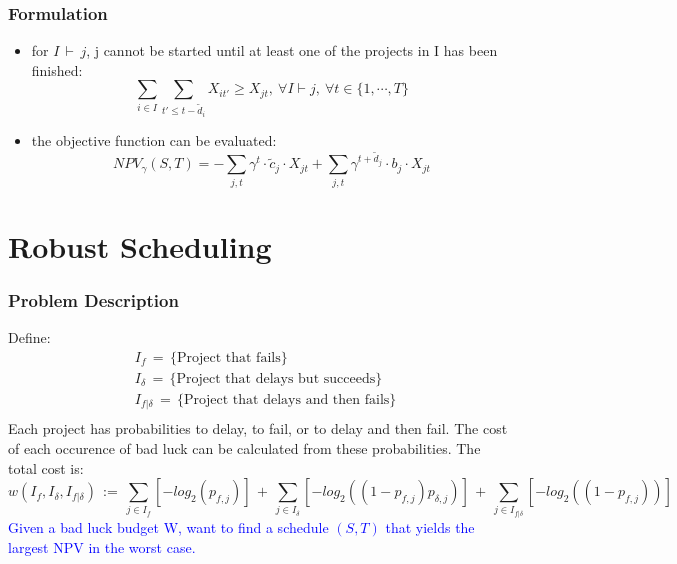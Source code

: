 \documentclass{beamer}
\newcommand{\tblue}{\textcolor{blue}}
\begin{document}
		\begin{frame}
			\frametitle{Formulation}
			\begin{itemize}
				\item for $I\,\vdash\,j$, j cannot be started until at least one of the projects in I has been finished:
					\begin{equation*}
						\label{EqnAnyPrecedence}
						\sum\limits_{i\in I}\sum\limits_{t'\leq t-\tilde{d}_i} X_{it'} \geq X_{jt},~\forall I \vdash j,~\forall t \in \{1,\cdots,T\}
					\end{equation*}
				\item the objective function can be evaluated:
					\begin{equation*}
						NPV_{\gamma}(S,T) = -\sum\limits_{j,t} \gamma^t \cdot \tilde{c}_j \cdot X_{jt} + \sum\limits_{j,t} \gamma^{t+\tilde{d}_j} \cdot b_j \cdot X_{jt}
					\end{equation*}
			\end{itemize}
		\end{frame}



\section{Robust Scheduling}
\begin{frame}
\frametitle{Problem Description}
Define:\\
\begin{align*}
	&I_f\,=\, \{\mbox{Project that fails}\}\\
	&I_{\delta}\,=\, \{\mbox{Project that delays but succeeds}\}\\
	&I_{f|\delta}\,=\, \{\mbox{Project that delays and then fails}\}\\
\end{align*}
Each project has probabilities to delay, to fail, or to delay and then fail. The cost of each occurence of bad luck can be calculated from these probabilities. The total cost is:
\begin{equation*}
	w(I_f, I_{\delta}, I_{f|\delta})\,:=\,\sum_{j\in I_f} [-log_2(p_{f,j})]\,+\,\sum_{j\in I_{\delta}}[-log_2((1-p_{f,j})p_{\delta,j})]\,+\,\sum_{j\in I_{f|\delta}}[-log_2((1-p_{f,j}))]
\end{equation*}
\bigskip
\tblue{Given a bad luck budget W,  want to find a schedule $(S, T)$ that yields the largest NPV in the worst case.}
\end{frame}

\end{document}
